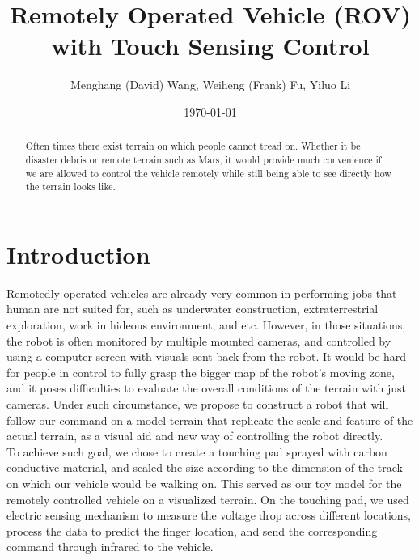 \documentclass[reprint,amsmath, amsfonts, amssymb, aps, letterpaper]{revtex4-1}
\begin{document}
\title{Remotely Operated Vehicle (ROV) with Touch Sensing Control}
\author{Menghang (David) Wang, Weiheng (Frank) Fu, Yiluo Li}

\date{\today}



\begin{abstract}
Often times there exist terrain on which people cannot tread on. Whether it be disaster debris or remote terrain such as Mars, it would provide much convenience if we are allowed to control the vehicle remotely while still being able to see directly how the terrain looks like.

\end{abstract}

\maketitle

\section{Introduction}
Remotedly operated vehicles are already very common in performing jobs that human are not suited for, such as underwater construction, extraterrestrial exploration, work in hideous environment, and etc. However, in those situations, the robot is often monitored by multiple mounted cameras, and controlled by using a computer screen with visuals sent back from the robot. It would be hard for people in control to fully grasp the bigger map of the robot's moving zone, and it poses difficulties to evaluate the overall conditions of the terrain with just cameras. Under such circumstance, we propose to construct a robot that will follow our command on a model terrain that replicate the scale and feature of the actual terrain, as a visual aid and new way of controlling the robot directly.
\\\indent To achieve such goal, we chose to create a touching pad sprayed with carbon conductive material, and scaled the size according to the dimension of the track on which our vehicle would be walking on. This served as our toy model for the remotely controlled vehicle on a visualized terrain. On the touching pad, we used electric sensing mechanism to measure the voltage drop across different locations, process the data to predict the finger location, and send the corresponding command through infrared to the vehicle.
\end{document}
